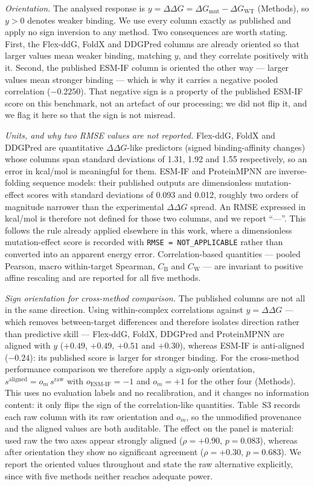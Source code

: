 \documentclass[11pt,a4paper]{article}
\begin{document}
\emph{Orientation.} The analysed response is $y = \Delta\Delta G = \Delta G_{\mathrm{mut}} -
\Delta G_{\mathrm{WT}}$ (Methods), so $y > 0$ denotes weaker binding. We use every column
exactly as published and apply no sign inversion to any method. Two consequences are worth
stating. First, the Flex-ddG, FoldX and DDGPred columns are already oriented so that larger
values mean weaker binding, matching $y$, and they correlate positively with it. Second, the
published ESM-IF column is oriented the other way --- larger values mean stronger binding ---
which is why it carries a negative pooled correlation ($-0.2250$). That negative sign is a
property of the published ESM-IF score on this benchmark, not an artefact of our processing;
we did not flip it, and we flag it here so that the sign is not misread.

\emph{Units, and why two RMSE values are not reported.} Flex-ddG, FoldX and DDGPred are
quantitative $\Delta\Delta G$-like predictors (signed binding-affinity changes) whose
columns span standard deviations of
1.31, 1.92 and 1.55 respectively, so an error in kcal/mol is meaningful for them. ESM-IF and
ProteinMPNN are inverse-folding sequence models: their published outputs are dimensionless
mutation-effect scores with standard deviations of 0.093 and 0.012, roughly two orders of
magnitude narrower than the experimental $\Delta\Delta G$ spread. An RMSE expressed in kcal/mol
is therefore not defined for those two columns, and we report ``---''. This follows the rule
already applied elsewhere in this work, where a dimensionless mutation-effect score is recorded
with \texttt{RMSE = NOT\_APPLICABLE} rather than converted into an apparent energy error.
Correlation-based quantities --- pooled Pearson, macro within-target Spearman,
$C_{\mathrm{B}}$ and $C_{\mathrm{W}}$ --- are invariant to positive affine rescaling and are reported for all five methods.

\emph{Sign orientation for cross-method comparison.} The published columns are not all in
the same direction. Using within-complex correlations against $y = \Delta\Delta G$ --- which
removes between-target differences and therefore isolates direction rather than predictive
skill --- Flex-ddG, FoldX, DDGPred and ProteinMPNN are aligned with $y$ ($+0.49$, $+0.49$,
$+0.51$ and $+0.30$), whereas ESM-IF is anti-aligned ($-0.24$): its published score is larger
for stronger binding. For the cross-method performance comparison we therefore apply a
sign-only orientation, $s^{\mathrm{aligned}} = o_m\, s^{\mathrm{raw}}$ with
$o_{\mathrm{ESM\text{-}IF}} = -1$ and $o_m = +1$ for the other four (Methods). This uses no
evaluation labels and no recalibration, and it changes no information content: it only flips
the sign of the correlation-like quantities. Table~S3 records each raw column with its raw
orientation and $o_m$, so the unmodified provenance and the aligned values are both
auditable. The effect on the panel is material: used raw the two axes appear strongly
aligned ($\rho = +0.90$, $p = 0.083$), whereas after orientation they show no significant
agreement ($\rho = +0.30$, $p = 0.683$). We report the oriented values throughout and state
the raw alternative explicitly, since with five methods neither reaches adequate power.
\end{document}
